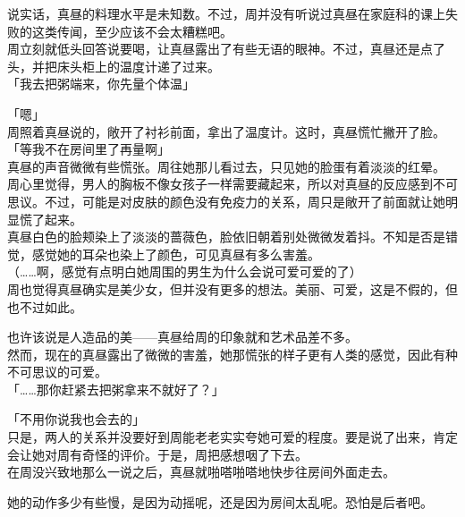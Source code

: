 说实话，真昼的料理水平是未知数。不过，周并没有听说过真昼在家庭科的课上失败的这类传闻，至少应该不会太糟糕吧。\\

周立刻就低头回答说要喝，让真昼露出了有些无语的眼神。不过，真昼还是点了头，并把床头柜上的温度计递了过来。\\

「我去把粥端来，你先量个体温」

「嗯」\\

周照着真昼说的，敞开了衬衫前面，拿出了温度计。这时，真昼慌忙撇开了脸。\\

「等我不在房间里了再量啊」\\

真昼的声音微微有些慌张。周往她那儿看过去，只见她的脸蛋有着淡淡的红晕。\\

周心里觉得，男人的胸板不像女孩子一样需要藏起来，所以对真昼的反应感到不可思议。不过，可能是对皮肤的颜色没有免疫力的关系，周只是敞开了前面就让她明显慌了起来。\\

真昼白色的脸颊染上了淡淡的蔷薇色，脸依旧朝着别处微微发着抖。不知是否是错觉，感觉她的耳朵也染上了颜色，可见真昼有多么害羞。\\

（……啊，感觉有点明白她周围的男生为什么会说可爱可爱的了）\\

周也觉得真昼确实是美少女，但并没有更多的想法。美丽、可爱，这是不假的，但也不过如此。

也许该说是人造品的美——真昼给周的印象就和艺术品差不多。\\

然而，现在的真昼露出了微微的害羞，她那慌张的样子更有人类的感觉，因此有种不可思议的可爱。\\

「……那你赶紧去把粥拿来不就好了？」

「不用你说我也会去的」\\

只是，两人的关系并没要好到周能老老实实夸她可爱的程度。要是说了出来，肯定会让她对周有奇怪的评价。于是，周把感想咽了下去。\\

在周没兴致地那么一说之后，真昼就啪嗒啪嗒地快步往房间外面走去。

她的动作多少有些慢，是因为动摇呢，还是因为房间太乱呢。恐怕是后者吧。\\

